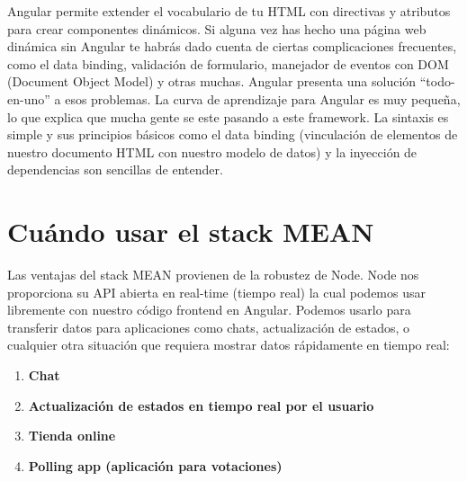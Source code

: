 Angular permite extender el vocabulario de tu HTML con directivas y atributos para crear componentes dinámicos. Si alguna vez has hecho una página web dinámica sin Angular te habrás dado cuenta de ciertas complicaciones frecuentes, como el data binding, validación de formulario, manejador de eventos con DOM (Document Object Model) y otras muchas. Angular presenta una solución “todo-en-uno” a esos problemas.
La curva de aprendizaje para Angular es muy pequeña, lo que explica que mucha gente se este pasando a este framework. La sintaxis es simple y sus principios básicos como el data binding (vinculación de elementos de nuestro documento HTML con nuestro modelo de datos) y la inyección de dependencias son sencillas de entender.

\section{Cuándo usar el stack MEAN}
Las ventajas del stack MEAN provienen de la robustez de Node. Node nos proporciona su API abierta en real-time (tiempo real) la cual podemos usar libremente con nuestro código frontend en Angular. 
Podemos usarlo para transferir datos para aplicaciones como chats, actualización de estados, o cualquier otra situación que requiera mostrar datos rápidamente en tiempo real:


\begin{enumerate}
    \item \textbf{Chat}
    \item \textbf{Actualización de estados en tiempo real por el usuario}
    \item \textbf{Tienda online}
    \item \textbf{Polling app (aplicación para votaciones)}
\end{enumerate}




